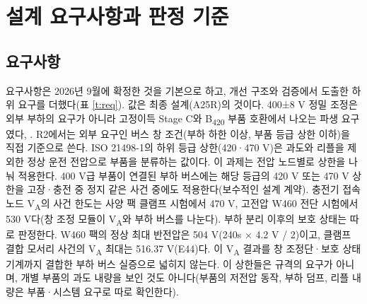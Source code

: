 \chapter{설계 요구사항과 판정 기준}

\section{요구사항}

요구사항은 2026년 9월에 확정한 것을 기본으로 하고, 개선 구조와 검증에서 도출한 하위 요구를 더했다(표 \ref{t:req}). 값은 최종 설계(A25R)의 것이다. 400±8 V 정밀 조정은 외부 부하의 요구가 아니라 고정이득 Stage C와 B\textsubscript{420} 부품 호환에서 나오는 파생 요구였다\cite{b9}, \cite{b10}. R2에서는 외부 요구인 버스 창 조건(부하 하한 이상, 부품 등급 상한 이하)을 직접 기준으로 쓴다. ISO 21498-1의 하위 등급 상한(420·470 V)은 과도와 리플을 제외한 정상 운전 전압으로 부품을 분류하는 값이다\cite{b9}. 이 과제는 전압 노드별로 상한을 나눠 적용한다. 400 V급 부품이 연결된 부하 버스에는 해당 등급의 420 V 또는 470 V 상한을 고장·충전 중 정지 같은 사건 중에도 적용한다(보수적인 설계 계약). 충전기 접속 노드 V\textsubscript{A}의 사건 한도는 사양 팩 클램프 시험에서 470 V, 고전압 W460 전단 시험에서 530 V다(창 조정 모듈이 V\textsubscript{A}와 부하 버스를 나눈다). 부하 분리 이후의 보호 상태는 따로 판정한다. W460 팩의 정상 최대 반전압은 504 V(240s × 4.2 V / 2)이고, 클램프 결합 모서리 사건의 V\textsubscript{A} 최대는 516.37 V(E44)다. 이 V\textsubscript{A} 결과를 창 조정단·보호 상태기계까지 결합한 부하 버스 실증으로 넓히지 않는다. 이 상한들은 규격의 요구가 아니며, 개별 부품의 과도 내량을 보인 것도 아니다(부품의 저전압 동작, 부하 덤프, 리플 내량은 부품·시스템 요구로 따로 확인한다).


